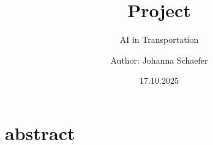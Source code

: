 



	\title{Project}
	\subtitle{AI in Transportation}
	\author{Author: Johanna Schaefer}
	\date{17.10.2025}
	\maketitle
	\vspace{3cm}
	
	\thispagestyle{empty}	%
	
	

	
	
	
	\thispagestyle{empty}
	\cleardoublepage
	\thispagestyle{empty}
	\section*{abstract}
	



	\newpage
	\tableofcontents
	\thispagestyle{empty}	%

	\newpage
	\setcounter{page}{1}	%
	

